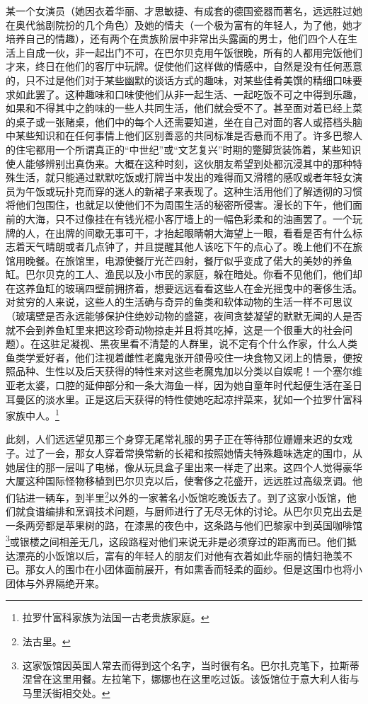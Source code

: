 \par 某一个女演员（她因衣着华丽、才思敏捷、有成套的德国瓷器而著名，远远胜过她在奥代翁剧院扮的几个角色）及她的情夫（一个极为富有的年轻人，为了他，她才培养自己的情趣），还有两个在贵族阶层中非常出头露面的男士，他们四个人在生活上自成一伙，非一起出门不可，在巴尔贝克用午饭很晚，所有的人都用完饭他们才来，终日在他们的客厅中玩牌。促使他们这样做的情感中，自然是没有任何恶意的，只不过是他们对于某些幽默的谈话方式的趣味，对某些佳肴美馔的精细口味要求如此罢了。这种趣味和口味使他们从非一起生活、一起吃饭不可之中得到乐趣，如果和不得其中之韵味的一些人共同生活，他们就会受不了。甚至面对着已经上菜的桌子或一张赌桌，他们中的每个人还需要知道，坐在自己对面的客人或搭档头脑中某些知识和在任何事情上他们区别善恶的共同标准是否悬而不用了。许多巴黎人的住宅都用一个所谓真正的“中世纪”或“文艺复兴”时期的蹩脚货装饰着，某些知识使人能够辨别出真伪来。大概在这种时刻，这伙朋友希望到处都沉浸其中的那种特殊生活，就只能通过默默吃饭或打牌当中发出的难得而又滑稽的感叹或者年轻女演员为午饭或玩扑克而穿的迷人的新裙子来表现了。这种生活用他们了解透彻的习惯将他们包围住，也就足以使他们不为周围生活的秘密所侵害。漫长的下午，他们面前的大海，只不过像挂在有钱光棍小客厅墙上的一幅色彩柔和的油画罢了。一个玩牌的人，在出牌的间歇无事可干，才抬起眼睛朝大海望上一眼，看看是否有什么标志着天气晴朗或者几点钟了，并且提醒其他人该吃下午的点心了。晚上他们不在旅馆用晚餐。在旅馆里，电源使餐厅光芒四射，餐厅似乎变成了偌大的美妙的养鱼缸。巴尔贝克的工人、渔民以及小市民的家庭，躲在暗处。你看不见他们，他们却在这养鱼缸的玻璃四壁前拥挤着，想要远远看看这些人在金光摇曳中的奢侈生活。对贫穷的人来说，这些人的生活确与奇异的鱼类和软体动物的生活一样不可思议（玻璃壁是否永远能够保护住绝妙动物的盛筵，夜间贪婪凝望的默默无闻的人是否就不会到养鱼缸里来把这珍奇动物掠走并且将其吃掉，这是一个很重大的社会问题）。在这驻足凝视、黑夜里看不清楚的人群里，说不定有个什么作家，什么人类鱼类学爱好者，他们注视着雌性老魔鬼张开颌骨咬住一块食物又闭上的情景，便按照品种、生性以及后天获得的特性来对这些老魔鬼加以分类以自娱呢！一个塞尔维亚老太婆，口腔的延伸部分和一条大海鱼一样，因为她自童年时代起便生活在圣日耳曼区的淡水里。正是这后天获得的特性使她吃起凉拌菜来，犹如一个拉罗什富科家族中人。\footnote{拉罗什富科家族为法国一古老贵族家庭。}
\par 此刻，人们远远望见那三个身穿无尾常礼服的男子正在等待那位姗姗来迟的女戏子。过了一会，那女人穿着常换常新的长裙和按照她情夫特殊趣味选定的围巾，从她居住的那一层叫了电梯，像从玩具盒子里出来一样走了出来。这四个人觉得豪华大厦这种国际怪物移植到巴尔贝克以后，使奢侈之花盛开，远远胜过高级烹调。他们钻进一辆车，到半里\footnote{法古里。}以外的一家著名小饭馆吃晚饭去了。到了这家小饭馆，他们就食谱编排和烹调技术问题，与厨师进行了无尽无休的讨论。从巴尔贝克出去是一条两旁都是苹果树的路，在漆黑的夜色中，这条路与他们巴黎家中到英国咖啡馆\footnote{这家饭馆因英国人常去而得到这个名字，当时很有名。巴尔扎克笔下，拉斯蒂涅曾在这里用餐。左拉笔下，娜娜也在这里吃过饭。该饭馆位于意大利人街与马里沃街相交处。}或银楼之间相差无几，这段路程对他们来说无非是必须穿过的距离而已。他们抵达漂亮的小饭馆以后，富有的年轻人的朋友们对他有衣着如此华丽的情妇艳羡不已。那女人的围巾在小团体面前展开，有如熏香而轻柔的面纱。但是这围巾也将小团体与外界隔绝开来。
